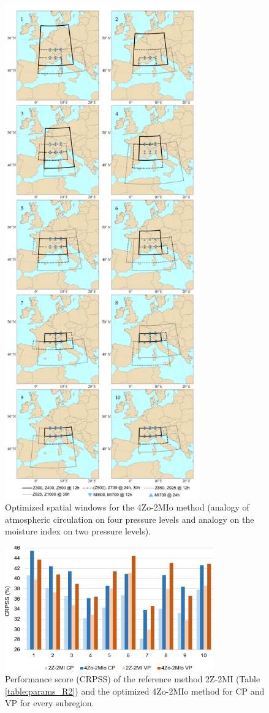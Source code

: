 \documentclass[review]{elsarticle}
\begin{document}
\begin{figure}[t]
	\centerline{\includegraphics[width=8.4cm]{figures/fig06.pdf}}
	\caption{Optimized spatial windows for the 4Zo-2MIo method (analogy of atmospheric circulation on four pressure levels and analogy on the moisture index on two pressure levels).}
	\label{fig:spatial_windows_4Zo-2MIo}
\end{figure}


\begin{figure}[t]
	\centerline{\includegraphics[width=9cm]{figures/fig07.pdf}}
	\caption{Performance score (CRPSS) of the reference method 2Z-2MI (Table \ref{table:params_R2}) and the optimized 4Zo-2MIo method for CP and VP for every subregion.}
	\label{fig:figure_crpss_4Zo-2HIo}
\end{figure}
\end{document}
